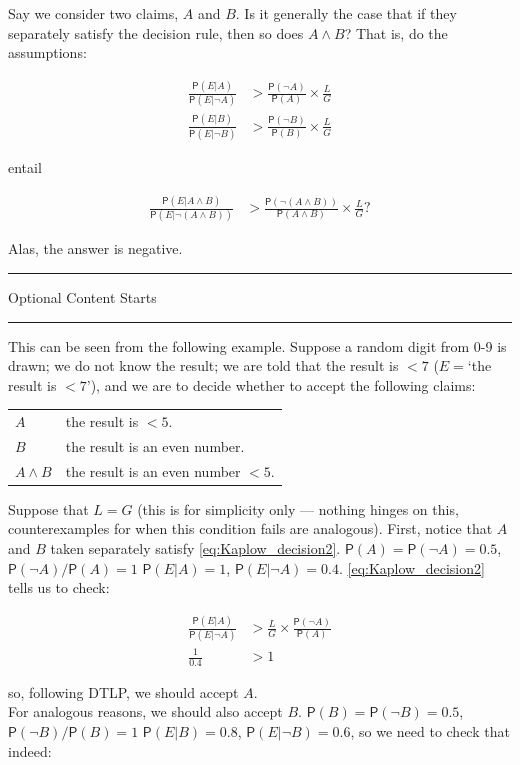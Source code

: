 \documentclass[10pt,dvipsnames,enabledeprecatedfontcommands]{scrartcl}
\newcommand{\n}{\neg}
\newcommand{\et}{\wedge}
\newcommand{\pr}[1]{\mathsf{P}(#1)}
\newcommand{\intermezzoa}{
	\begin{minipage}[c]{13cm}
	\begin{center}\rule{10cm}{0.4pt}



	\tiny{\sc Optional Content Starts}
	
	\vspace{-1mm}
	
	\rule{10cm}{0.4pt}\end{center}
	\end{minipage}\nopagebreak 
	}
\begin{document}
Say we consider two claims, \(A\) and \(B\). Is it generally the case
that if they separately satisfy the decision rule, then so does
\(A\et B\)? That is, do the assumptions:

\begin{align*}
 \frac{\pr{E\vert A}}{\pr{E\vert \n A}}  & > \frac{\pr{\n A}}{\pr{A}} \times \frac{L}{G}\\
 \frac{\pr{E\vert B}}{\pr{E\vert \n B}}  & > \frac{\pr{\n B}}{\pr{B}} \times \frac{L}{G}
 \end{align*}

\noindent entail

\begin{align*}
 \frac{\pr{E\vert A\et B}}{\pr{E\vert \n (A\et B)}}  & > \frac{\pr{\n (A\et B)}}{
 \pr{A\et B}} \times \frac{L}{G}?
 \end{align*}

Alas, the answer is negative.

\intermezzoa

This can be seen from the following example. Suppose a random digit from
0-9 is drawn; we do not know the result; we are told that the result is
\(<7\) (\(E=\)`the result is \(<7\)'), and we are to decide whether to
accept the following claims:

\begin{center}
 \begin{tabular}{@{}ll@{}}
 \toprule
 $A$ & the result is $<5$. \\
 $B$  & the result is an even number.\\
 $A\et B$ & the result is an even number $<5$. \\
 \bottomrule
 \end{tabular}
 \end{center}

Suppose that \(L=G\) (this is for simplicity only --- nothing hinges on
this, counterexamples for when this condition fails are analogous).
First, notice that \(A\) and \(B\) taken separately satisfy
\eqref{eq:Kaplow_decision2}. \(\pr{A}=\pr{\n A}=0.5\),
\(\pr{\n A}/\pr{A}=1\) \(\pr{E\vert A}=1\), \(\pr{E\vert \n A}=0.4\).
\eqref{eq:Kaplow_decision2} tells us to check:

\begin{align*}
 \frac{\pr{E\vert A}}{\pr{E\vert \n A}}&> \frac{L}{G}\times \frac{\pr{\n A}}{\pr{A}}\\
 \frac{1}{0.4} & > 1
 \end{align*}

\noindent so, following DTLP, we should accept \(A\).\\
For analogous reasons, we should also accept \(B\).
\(\pr{B}=\pr{\n B}=0.5\), \(\pr{\n B}/\pr{B}=1\) \(\pr{E\vert B}=0.8\),
\(\pr{E\vert \n B}=0.6\), so we need to check that indeed:
\end{document}
